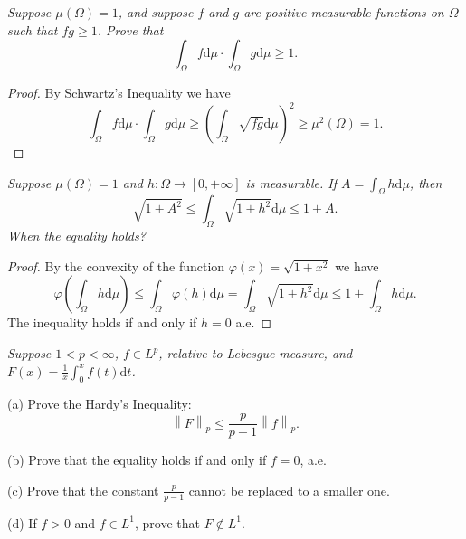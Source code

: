 \begin{problem}\em
Suppose $\mu(\Omega)=1$, and suppose $f$ and $g$ are positive measurable functions on $\Omega$ such that $fg\ge 1$. Prove that 
$$
\int_{\Omega}{f\mathrm{d}\mu}\cdot \int_{\Omega}{g\mathrm{d}\mu}\ge 1.
$$
\end{problem}
\begin{proof}
By Schwartz's Inequality we have 
$$
\int_{\Omega}{f\mathrm{d}\mu}\cdot \int_{\Omega}{g\mathrm{d}\mu}\ge \left( \int_{\Omega}{\sqrt{fg}\mathrm{d}\mu} \right) ^2\ge \mu ^2\left( \Omega \right) =1.
$$
\end{proof}
\begin{problem}\em
Suppose $\mu(\Omega)=1$ and $h:\Omega\to[0,+\infty]$ is measurable. If $A=\int_\Omega h\mathrm{d}\mu$, then 
$$
\sqrt{1+A^2}\le \int_{\Omega}{\sqrt{1+h^2}\mathrm{d}\mu}\le 1+A.
$$
When the equality holds?
\end{problem}
\begin{proof}
By the convexity of the function $\varphi(x)=\sqrt{1+x^2}$ we have 
$$
\varphi \left( \int_{\Omega}{h\mathrm{d}\mu} \right) \le \int_{\Omega}{\varphi \left( h \right) \mathrm{d}\mu}=\int_{\Omega}{\sqrt{1+h^2}\mathrm{d}\mu}\le 1+\int_{\Omega}{h\mathrm{d}\mu}.
$$
The inequality holds if and only if $h=0$ a.e.
\end{proof}
\begin{problem}\em
Suppose $1<p<\infty$, $f\in L^p$, relative to Lebesgue measure, and $F(x)=\frac{1}{x}\int_0^xf(t)\mathrm{d}t$.\par
(a) Prove the Hardy's Inequality:
$$
\left\| F \right\| _p\le \frac{p}{p-1}\left\| f \right\| _p.
$$\par
(b) Prove that the equality holds if and only if $f=0$, a.e.\par
(c) Prove that the constant $\frac{p}{p-1}$ cannot be replaced to a smaller one.\par
(d) If $f>0$ and $f\in L^1$, prove that $F\notin L^1$.
\end{problem}
